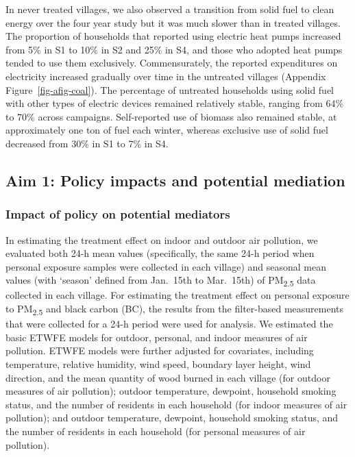 \documentclass[
  letterpaper,
  DIV=11,
  numbers=noendperiod]{scrartcl}
\begin{document}
In never treated villages, we also observed a transition from solid fuel
to clean energy over the four year study but it was much slower than in
treated villages. The proportion of households that reported using
electric heat pumps increased from 5\% in S1 to 10\% in S2 and 25\% in
S4, and those who adopted heat pumps tended to use them exclusively.
Commensurately, the reported expenditures on electricity increased
gradually over time in the untreated villages (Appendix
Figure~\ref{fig-afig-coal}). The percentage of untreated households
using solid fuel with other types of electric devices remained
relatively stable, ranging from 64\% to 70\% across campaigns.
Self-reported use of biomass also remained stable, at approximately one
ton of fuel each winter, whereas exclusive use of solid fuel decreased
from 30\% in S1 to 7\% in S4.

\hypertarget{aim-1-policy-impacts-and-potential-mediation}{%
\subsection{Aim 1: Policy impacts and potential
mediation}\label{aim-1-policy-impacts-and-potential-mediation}}

\hypertarget{impact-of-policy-on-potential-mediators}{%
\subsubsection{Impact of policy on potential
mediators}\label{impact-of-policy-on-potential-mediators}}

In estimating the treatment effect on indoor and outdoor air pollution,
we evaluated both 24-h mean values (specifically, the same 24-h period
when personal exposure samples were collected in each village) and
seasonal mean values (with `season' defined from Jan.~15th to Mar.~15th)
of PM\textsubscript{2.5} data collected in each village. For estimating
the treatment effect on personal exposure to PM\textsubscript{2.5} and
black carbon (BC), the results from the filter-based measurements that
were collected for a 24-h period were used for analysis. We estimated
the basic ETWFE models for outdoor, personal, and indoor measures of air
pollution. ETWFE models were further adjusted for covariates, including
temperature, relative humidity, wind speed, boundary layer height, wind
direction, and the mean quantity of wood burned in each village (for
outdoor measures of air pollution); outdoor temperature, dewpoint,
household smoking status, and the number of residents in each household
(for indoor measures of air pollution); and outdoor temperature,
dewpoint, household smoking status, and the number of residents in each
household (for personal measures of air pollution).
\end{document}
